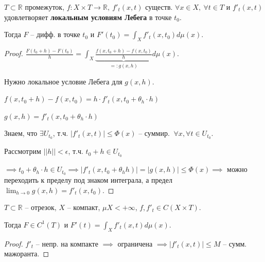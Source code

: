 \begin{theorem}
    $T \subset \mathbb{R}$ промежуток, $f : X \times T \rightarrow \mathbb{R}, \ f'_t (x, t)$ существ. $\forall x \in X, \ \forall t \in T$ и $f'_t(x, t)$ удовлетворяет \textbf{локальным условиям Лебега} в точке $t_0$.

    Тогда $F$ -- дифф. в точке $t_0$ и $F'(t_0) = \int_X { f'_t (x, t_0) d \mu (x) }$. 
\end{theorem}
\begin{proof}
    $\frac{F(t_0 + h) - F(t_0)}{h} = \int_X {\underbrace{\frac{f(x, t_0 + h) - f(x, t_0)}{h}}_{=: g(x, h)}}d \mu (x)$.

    Нужно локальное условие Лебега для $g(x, h)$.

    $f(x, t_0 + h) - f(x, t_0) = h \cdot f'_t(x, t_0 + \theta_h \cdot h)$

    $g(x, h) = f'_t(x, t_0 + \theta_h \cdot h)$

    Знаем, что $\exists U_{t_0}$, т.ч. $| f'_t(x, t) | \leq \Phi(x)$ -- суммир. $\ \forall x, \forall t \in U_{t_0}$.

    Рассмотрим $|| h || < \epsilon$, т.ч. $t_0 + h \in U_{t_0}$
    

    $\implies t_0 + \theta_h \cdot h \in U_{t_0} \implies | f'_t(x, t_0 + \theta_h h) | = |g(x, h)| \leq \Phi(x) \implies $ можно переходить к пределу под знаком интеграла, а предел $\lim_{h \rightarrow 0} {g(x, h)} = f'_t(x, t_0)$.
\end{proof}

\begin{consequence}
    $T \subset \mathbb{R}$ -- отрезок, $X$ -- компакт, $\mu X < +\infty$, $f, f'_t \in C(X \times T)$.

    Тогда $F \in C^1(T)$ и $F'(t) = \int_X{f'_t (x, t) d \mu (x)}$.
\end{consequence}

\begin{proof}
    $f'_t$ -- непр. на компакте $\implies$ ограничена $\implies | f'_t(x, t) | \leq M$ -- сумм. мажоранта.
\end{proof}



